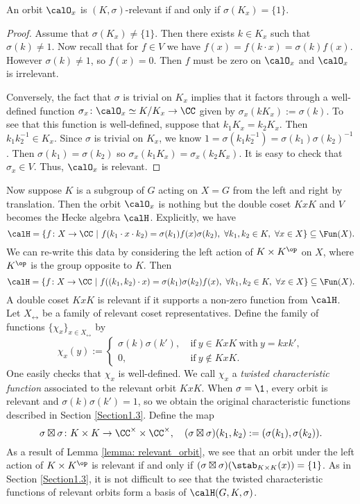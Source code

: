 \begin{lem}\label{lemma: relevant_orbit}
    An orbit $\calO_x$ is $(K,\sigma)$-relevant if and only if $\sigma(K_x) = \{1\}$.
\end{lem}
\begin{proof}
    Assume that $\sigma(K_x)\neq\{1\}$.
    Then there exists $k\in K_x$  such that $\sigma(k)\neq 1$.
    Now recall that for $f\in V$ we have $f(x) = f(k\cdot x) = \sigma(k)f(x)$.
    However $\sigma(k)\neq 1$, so $f(x)=0$.
    Then $f$ must be zero on $\calO_x$ and $\calO_x$ is irrelevant.

    Conversely, the fact that $\sigma$ is trivial on $K_x$ implies that it factors through a well-defined function $\sigma_x\colon \calO_x\simeq K/K_x\rightarrow \CC$ given by $\sigma_x(kK_x) := \sigma(k)$.
    To see that this function is well-defined, suppose that $k_1K_x=k_2K_x$.
    Then $k_1k_2^{-1}\in K_x$.
    Since $\sigma$ is trivial on $K_x$, we know $1=\sigma(k_1k_2^{-1})=\sigma(k_1)\sigma(k_2)^{-1}$.
    Then $\sigma(k_1)=\sigma(k_2)$ so $\sigma_x(k_1K_x) = \sigma_x(k_2K_x)$.
    It is easy to check that $\sigma_x\in V$.
    Thus, $\calO_x$ is relevant.
\end{proof}
Now suppose $K$ is a subgroup of $G$ acting on $X=G$ from the left and right by translation.
Then the orbit $\calO_x$ is nothing but the double coset $KxK$ and $V$ becomes the Hecke algebra $\calH$.
Explicitly, we have
\[
    \calH = \{f\colon X\to\CC \ |\ f(k_1\cdot x \cdot k_2) = \sigma(k_1)f(x)\sigma(k_2),\ \forall k_1,k_2\in K,\ \forall x\in X\}\subseteq \Fun(X).
\]
We can re-write this data by considering the left action of $K\times K^\op$ on $X$, where $K^\op$ is the group opposite to $K$.
Then
\[
    \calH = \{f\colon X\to\CC \ |\ f((k_1,k_2)\cdot x) = \sigma(k_1)\sigma(k_2)f(x),\ \forall k_1,k_2\in K,\ \forall x\in X\}\subseteq\Fun(X).
\]
A double coset $KxK$ is relevant if it supports a non-zero function from $\calH$.
Let $X_\rel$ be a family of relevant coset representatives.
Define the family of functions $\{\chi_x\}_{x\in X_\rel}$ by
\[
    \chi_x(y) := \begin{cases}
        \sigma(k)\sigma(k'),\  & \text{if}\ y\in KxK\ \text{with}\ y=kxk', \\
        0,\                    & \text{if}\ y\notin KxK.
    \end{cases}
\]
One easily checks that $\chi_x$ is well-defined.
We call $\chi_x$ a \emph{twisted characteristic function} associated to the relevant orbit $KxK$.
When $\sigma=\1$, every orbit is relevant and $\sigma(k)\sigma(k')=1$, so we obtain the original characteristic functions described in Section \ref{Section1.3}.
Define the map
\[
    \sigma\boxtimes\sigma\colon K\times K\to\CC^\times\times\CC^\times,\quad (\sigma\boxtimes\sigma)(k_1,k_2) := (\sigma(k_1),\sigma(k_2)).
\]
As a result of Lemma \ref{lemma: relevant_orbit}, we see that an orbit under the left action of $K\times K^\op$ is relevant if and only if $(\sigma\boxtimes\sigma)(\stab_{K\times K}(x)) = \{1\}$.
As in Section \ref{Section1.3}, it is not difficult to see that the twisted characteristic functions of relevant orbits form a basis of $\calH(G,K,\sigma)$.

